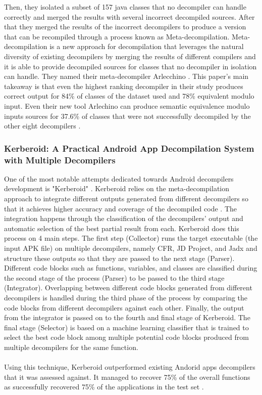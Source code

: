 \documentclass[conference,a4paper]{IEEEtran}
\begin{document}
Then, they isolated a subset of 157 java classes that no decompiler can handle correctly and merged the results with several incorrect decompiled sources.
After that they merged the results of the incorrect decompilers to produce a version that can be recompiled through a process known as Meta-decompilation. Meta-decompilation is a new approach for decompilation that leverages the natural diversity of existing decompilers by merging the results of different compilers and it is able to provide decompiled sources for classes that no decompiler in isolation can handle. They named their meta-decompiler Arlecchino \cite{harrand_java_2020}.
This paper’s main takeaway is that even the highest ranking decompiler in their study produces correct output for 84\% of classes of the dataset used and 78\% equivalent modulo input. Even their new tool Arlechino can produce semantic equivalence modulo inputs sources for 37.6\% of classes that were not successfully decompiled by the other eight decompilers \cite{harrand_java_2020}.

\subsubsection{Kerberoid: A Practical Android App Decompilation System with Multiple Decompilers}
One of the most notable attempts dedicated towards Android decompilers development is "Kerberoid" \cite{jang_kerberoid_2019}. Kerberoid relies on the meta-decompilation approach to integrate different outputs generated from different decompilers so that it achieves higher accuracy and coverage of the decompiled code \cite{jang_kerberoid_2019}. The integration happens through the classification of the decompilers' output and automatic selection of the best partial result from each. Kerberoid does this process on 4 main steps. The first step (Collector) runs the target executable (the input APK file) on multiple decompilers, namely CFR, JD Project, and Jadx and structure these outputs so that they are passed to the next stage (Parser). Different code blocks such as functions, variables, and classes are classified during the second stage of the process (Parser) to be passed to the third stage (Integrator). Overlapping between different code blocks generated from different decompilers is handled during the third phase of the process by comparing the code blocks from different decompilers against each other. Finally, the output from the integrator is passed on to the fourth and final stage of Kerberoid. The final stage (Selector) is based on a machine learning classifier that is trained to select the best code block among multiple potential code blocks produced from multiple decompilers for the same function.\\\\
Using this technique, Kerberoid outperformed existing Andorid apps decompilers that it was assessed against. It managed to recover 75\% of the overall functions as successfully recovered 75\% of the applications in the test set \cite{jang_kerberoid_2019}.
\end{document}
